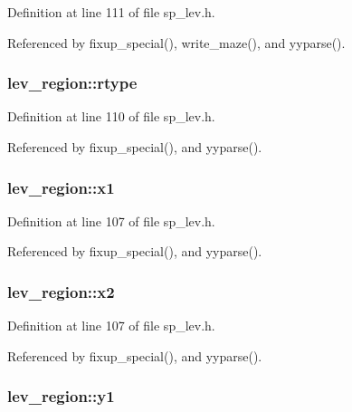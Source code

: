 Definition at line 111 of file sp\+\_\+lev.\+h.



Referenced by fixup\+\_\+special(), write\+\_\+maze(), and yyparse().

\hypertarget{structlev__region_a428f47785b096c23eacbf88a37a06825}{
\subsubsection[{rtype}]{ lev\+\_\+region\+::rtype}}\label{structlev__region_a428f47785b096c23eacbf88a37a06825}


Definition at line 110 of file sp\+\_\+lev.\+h.



Referenced by fixup\+\_\+special(), and yyparse().

\hypertarget{structlev__region_af8f82a8cbbd45def87d2d011f90ba84c}{
\subsubsection[{x1}]{ lev\+\_\+region\+::x1}}\label{structlev__region_af8f82a8cbbd45def87d2d011f90ba84c}


Definition at line 107 of file sp\+\_\+lev.\+h.



Referenced by fixup\+\_\+special(), and yyparse().

\hypertarget{structlev__region_aa2cd141352fa638ca035a3336943c568}{
\subsubsection[{x2}]{ lev\+\_\+region\+::x2}}\label{structlev__region_aa2cd141352fa638ca035a3336943c568}


Definition at line 107 of file sp\+\_\+lev.\+h.



Referenced by fixup\+\_\+special(), and yyparse().

\hypertarget{structlev__region_a518d0af0a741147e9cd90704020f4067}{
\subsubsection[{y1}]{ lev\+\_\+region\+::y1}}\label{structlev__region_a518d0af0a741147e9cd90704020f4067}


